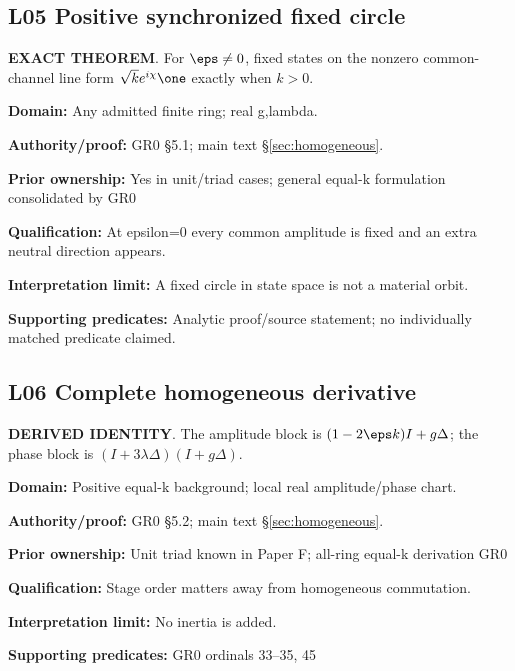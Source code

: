 \par\noindent\begin{minipage}{\linewidth}
\subsection*{L05 Positive synchronized fixed circle}
\textbf{EXACT THEOREM}. For \(\eps\ne0\), fixed states on the nonzero common-channel line form \(\sqrt{k}e^{i\chi}\one\) exactly when \(k>0\).\par
\textbf{Domain:} Any admitted finite ring; real g,lambda.\par
\textbf{Authority/proof:} GR0 \S{}5.1; main text \S\ref{sec:homogeneous}.\par
\textbf{Prior ownership:} Yes in unit/triad cases; general equal-k formulation consolidated by GR0\par
\textbf{Qualification:} At epsilon=0 every common amplitude is fixed and an extra neutral direction appears.\par
\textbf{Interpretation limit:} A fixed circle in state space is not a material orbit.\par
\textbf{Supporting predicates:} Analytic proof/source statement; no individually matched predicate claimed.\par
\end{minipage}\par\medskip
\par\noindent\begin{minipage}{\linewidth}
\subsection*{L06 Complete homogeneous derivative}
\textbf{DERIVED IDENTITY}. The amplitude block is \((1-2\eps k)I+g\Delta\); the phase block is \((I+3\lambda\Delta)(I+g\Delta)\).\par
\textbf{Domain:} Positive equal-k background; local real amplitude/phase chart.\par
\textbf{Authority/proof:} GR0 \S{}5.2; main text \S\ref{sec:homogeneous}.\par
\textbf{Prior ownership:} Unit triad known in Paper F; all-ring equal-k derivation GR0\par
\textbf{Qualification:} Stage order matters away from homogeneous commutation.\par
\textbf{Interpretation limit:} No inertia is added.\par
\textbf{Supporting predicates:} GR0 ordinals 33--35, 45\par
\end{minipage}\par\medskip
